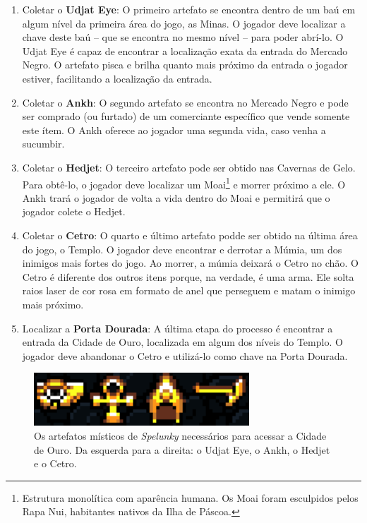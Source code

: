 \begin{enumerate}
	\item Coletar o \textbf{Udjat Eye}: O primeiro artefato se encontra dentro
	de um baú em algum nível da primeira área do jogo, as Minas. O jogador deve
	localizar a chave deste baú -- que se encontra no mesmo nível -- para poder
	abrí-lo. O Udjat Eye é capaz de encontrar a localização exata da entrada do
	Mercado Negro. O artefato pisca e brilha quanto mais próximo da entrada o
	jogador estiver, facilitando a localização da entrada.

	\item Coletar o \textbf{Ankh}: O segundo artefato se encontra no Mercado
	Negro e pode ser comprado (ou furtado) de um comerciante específico que
	vende somente este ítem. O Ankh oferece ao jogador uma segunda vida, caso
	venha a sucumbir.

	\item Coletar o \textbf{Hedjet}: O terceiro artefato pode ser obtido nas
	Cavernas de Gelo. Para obtê-lo, o jogador deve localizar um Moai\footnote{
	Estrutura monolítica com aparência humana. Os Moai foram esculpidos pelos
	Rapa Nui, habitantes nativos da Ilha de Páscoa.} e morrer próximo a ele. O
	Ankh trará o jogador de volta a vida dentro do Moai e permitirá que o
	jogador colete o Hedjet.

	\item Coletar o \textbf{Cetro}: O quarto e último artefato podde ser obtido
	na última área do jogo, o Templo. O jogador deve encontrar e derrotar a
	Múmia, um dos inimigos mais fortes do jogo. Ao morrer, a múmia deixará o
	Cetro no chão. O Cetro é diferente dos outros itens porque, na verdade, é
	uma arma. Ele solta raios laser de cor rosa em formato de anel que perseguem
	e matam o inimigo mais próximo.

	\item Localizar a \textbf{Porta Dourada}: A última etapa do processo é
	encontrar a entrada da Cidade de Ouro, localizada em algum dos níveis do
	Templo. O jogador deve abandonar o Cetro e utilizá-lo como chave na Porta
	Dourada.
\end{enumerate}

\begin{figure}[htb!]
\centering
\includegraphics[width=.65\textwidth]{fig/spelunky-artifacts.pdf}
\caption{\label{fig:spelunky-artifacts}Os artefatos místicos de
\textit{Spelunky} necessários para acessar a Cidade de Ouro. Da esquerda para a
direita: o Udjat Eye, o Ankh, o Hedjet e o Cetro.}
\end{figure}

